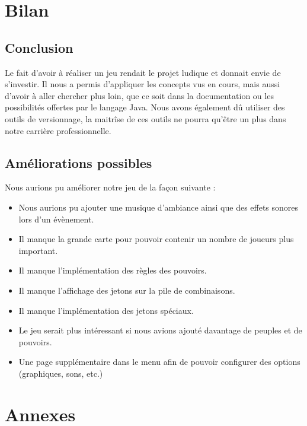 \documentclass[a4paper]{report}
\begin{document}
\chapter{Bilan}
\section{Conclusion}
\par
Le fait d'avoir à réaliser un jeu rendait le projet ludique et donnait envie de s'investir. Il nous a permis d'appliquer les concepts vus en cours, mais aussi d'avoir à aller chercher plus loin, que ce soit dans la documentation ou les possibilités offertes par le langage Java. Nous avons également dû utiliser des outils de versionnage, la maitrîse de ces outils ne pourra qu'être un plus dans notre carrière professionnelle.
\section{Améliorations possibles}
\par
Nous aurions pu améliorer notre jeu de la façon suivante :
\begin{itemize}
\item Nous aurions pu ajouter une musique d'ambiance ainsi que des effets sonores lors d'un évènement.
\item Il manque la grande carte pour pouvoir contenir un nombre de joueurs plus important.
\item Il manque l'implémentation des règles des pouvoirs.
\item Il manque l'affichage des jetons sur la pile de combinaisons.
\item Il manque l'implémentation des jetons spéciaux.
\item Le jeu serait plus intéressant si nous avions ajouté davantage de peuples et de pouvoirs.
\item Une page supplémentaire dans le menu afin de pouvoir configurer des options (graphiques, sons, etc.)
\end{itemize}
\newpage
\chapter{Annexes}
\end{document}
